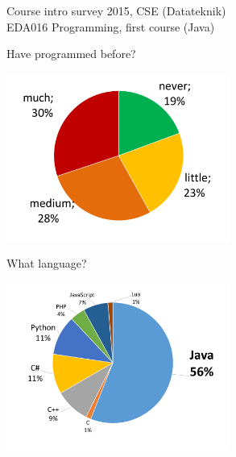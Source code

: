 \documentclass{lecturenotes}
\begin{document}
\begin{Slide}{Course intro survey 2015, CSE (Datateknik)\\EDA016 Programming, first course (Java)}
\begin{multicols}{2}
Have programmed before? \vspace{1em}

\includegraphics[width=0.55\textwidth]{img/survey-2015}
\columnbreak

\raggedleft What language?  \vspace{1em}

\includegraphics[width=0.55\textwidth]{img/lang-2015}
\end{multicols}
\end{Slide}
\end{document}
